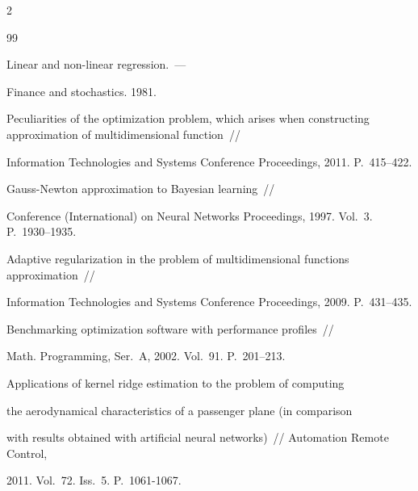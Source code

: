 \begin{multicols}{2}
{{\begin{thebibliography}{99}


  Linear and non-linear regression.~---

  Finance and stochastics. 1981.





Peculiarities of the optimization problem, which arises when constructing approximation of multidimensional function~//

Information Technologies and Systems Conference Proceedings, 2011. P.~415--422.





  Gauss-Newton approximation to Bayesian learning~//

Conference (International) on Neural Networks Proceedings, 1997. Vol.~3. P.~1930--1935.





  Adaptive regularization in the problem of multidimensional functions approximation~//

Information Technologies and Systems Conference Proceedings, 2009. P.~431--435.





  {Benchmarking optimization software with performance profiles}~//

    Math. Programming, Ser.~A, 2002. Vol.~91. P.~201--213.

  



Applications of kernel ridge estimation to the problem of computing 

the aerodynamical characteristics of a passenger plane (in comparison 

with results obtained with artificial neural networks)~//  Automation Remote Control,

2011. Vol.~72. Iss.~5. P.~1061-1067.




\end{thebibliography}}}
\end{multicols}
